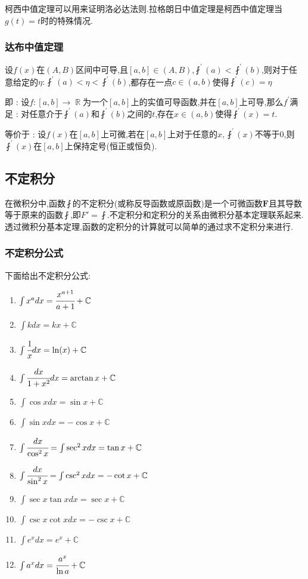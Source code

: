 \documentclass[UTF8,12pt]{ctexbook}
\newcommand{\derivative}{^\prime}
\newcommand{\fDerivative}[1]{\fint\derivative(#1)}
\newcommand{\defFunction}[1]{f(#1)}
\newcommand{\mathConstant}{\mathbb{C}}
\newcommand{\mediumBigCase}[1]{\left[#1\right]}
\DeclareMathOperator{\mathRealNumberCollection}{\mathbb{R}}
\begin{document}
{{{{  柯西中值定理可以用来证明洛必达法则.拉格朗日中值定理是柯西中值定理当$g(t) = t$时的特殊情况.
}%

\subsubsection{达布中值定理}{
  设$\defFunction{x}$在$(A,B)$区间中可导,且$\mediumBigCase{a,b} \in (A,B)$,$\fDerivative{a} < \fDerivative{b}$,则对于任意给定的$\eta : \fDerivative{a} < \eta < \fDerivative{b}$,都存在一点$c \in (a,b)$使得$\fDerivative{c} = \eta$

  即 : 设$f : \mediumBigCase{a,b} \to \mathRealNumberCollection$为一个$\mediumBigCase{a,b}$上的实值可导函数,并在$\mediumBigCase{a,b}$上可导,那么$f\derivative$满足 : 对任意介于$\fDerivative{a}$和$\fDerivative{b}$之间的$t$,存在$x \in (a,b)$使得$\fDerivative{x} = t$.

  等价于 : 设$\defFunction{x}$在$\mediumBigCase{a,b}$上可微,若在$\mediumBigCase{a,b}$上对于任意的$x,\fDerivative{x}$不等于0,则$\fDerivative{x}$在$\mediumBigCase{a,b}$上保持定号(恒正或恒负).
}%

}%

\subsection{不定积分}{
  在微积分中,函数$\fint$的不定积分(或称反导函数或原函数)是一个可微函数$\mathbf{F}$且其导数等于原来的函数$\fint$,即$F\prime = \fint$.不定积分和定积分的关系由微积分基本定理联系起来.透过微积分基本定理,函数的定积分的计算就可以简单的通过求不定积分来进行.

  \subsubsection{不定积分公式}{
    下面给出不定积分公式:

    \begin{enumerate}
      \item $\int x^adx = \cfrac{x^{a+1}}{a+1} + \mathConstant$
      \item $\int kdx = kx + \mathConstant$
      \item $\int \cfrac{1}{x}dx = \ln(x) + \mathConstant$
      \item $\int \cfrac{dx}{1+x^2}dx = \arctan x + \mathConstant$
      \item $\int \cos xdx = \sin x + \mathConstant$
      \item $\int \sin xdx = -\cos x + \mathConstant$
      \item $\int \cfrac{dx}{\cos^2x} = \int \sec^2xdx = \tan x + \mathConstant$
      \item $\int \cfrac{dx}{\sin^2x} = \int\csc^2xdx = -\cot x + \mathConstant$
      \item $\int \sec x\tan xdx = \sec x + \mathConstant$
      \item $\int \csc x\cot xdx = -\csc x + \mathConstant$
      \item $\int e^xdx = e^x + \mathConstant$
      \item $\int a^xdx = \cfrac{a^x}{\ln a} + \mathConstant$
    \end{enumerate}

}}}}
\end{document}
